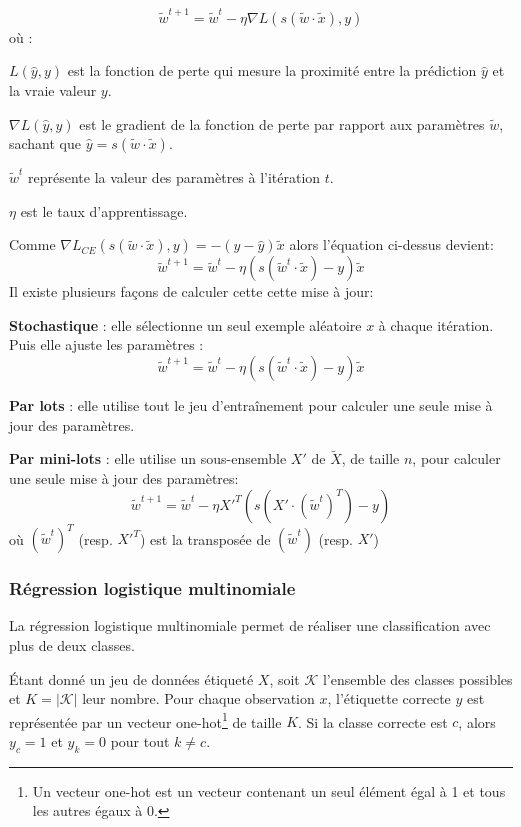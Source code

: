 \documentclass[12pt,a4paper]{report}
\begin{document}
	\[
	\tilde{w}^{t+1}=\tilde{w}^t - \eta\nabla L(s(\tilde{w} \cdot \tilde{x}), y) 
	\]
	où :
	\begin{itemizeFB}
		\item $L(\hat{y}, y)$ est la fonction de perte qui mesure la proximité entre la prédiction $\hat{y}$ et la vraie valeur $y$.
		\item $\nabla L(\hat{y}, y)$ est le gradient de la fonction de perte par rapport aux paramètres $\tilde{w}$, sachant que $\hat{y} = s(\tilde{w} \cdot \tilde{x})$.
		\item $\tilde{w}^t$ représente la valeur des paramètres à l’itération $t$.
		\item $\eta$ est le taux d’apprentissage.
	\end{itemizeFB}
	
	Comme $\nabla L_{CE}(s(\tilde{w} \cdot \tilde{x}), y) = -(y-\hat{y})\tilde{x}$ alors l'équation ci-dessus devient:
	\[ 
	\tilde{w}^{t+1}=\tilde{w}^t - \eta (s(\tilde{w}^t \cdot \tilde{x}) - y)\tilde{x} 
	\]
	Il existe plusieurs façons de calculer cette cette mise à jour:
	
	\begin{itemizeFB}
		\item \textbf{Stochastique} : elle sélectionne un seul exemple aléatoire $x$ à chaque itération. Puis elle ajuste les paramètres :
		\[ 
		\tilde{w}^{t+1}=\tilde{w}^t - \eta (s(\tilde{w}^t \cdot \tilde{x}) - y)\tilde{x} 
		\]
		\item \textbf{Par lots} : elle utilise tout le jeu d’entraînement pour calculer une seule mise à jour des paramètres.
		\item \textbf{Par mini-lots} : elle utilise un sous-ensemble $X'$ de $\tilde{X}$, de taille $n$, pour calculer une seule mise à jour des paramètres:
		\[
		\tilde{w}^{t+1}=\tilde{w}^t - \eta X'^T(s(X' \cdot (\tilde{w}^t)^T) - y) 
		\]
		où $(\tilde{w}^t)^T$ (resp. $X'^T$) est la transposée de $(\tilde{w}^t)$ (resp. $X'$) 
	\end{itemizeFB}
	
\subsubsection{Régression logistique multinomiale}

La régression logistique multinomiale permet de réaliser une classification avec plus de deux classes.

Étant donné un jeu de données étiqueté $X$, soit $ \mathcal{K} $ l’ensemble des classes possibles et $ K = |\mathcal{K}| $ leur nombre. Pour chaque observation $ x $, l’étiquette correcte $y$ est représentée par un vecteur one-hot\footnote{Un vecteur one-hot est un vecteur contenant un seul élément égal à 1 et tous les autres égaux à 0.} de taille $K$. Si la classe correcte est $c$, alors $ y_c = 1 $ et $ y_k = 0 $ pour tout $ k \neq c $.
\end{document}

